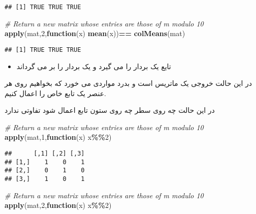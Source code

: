 \documentclass[
]{article}
\newenvironment{Shaded}{\begin{snugshade}}{\end{snugshade}}
\newcommand{\CommentTok}[1]{\textcolor[rgb]{0.56,0.35,0.01}{\textit{#1}}}
\newcommand{\ControlFlowTok}[1]{\textcolor[rgb]{0.13,0.29,0.53}{\textbf{#1}}}
\newcommand{\DecValTok}[1]{\textcolor[rgb]{0.00,0.00,0.81}{#1}}
\newcommand{\FunctionTok}[1]{\textcolor[rgb]{0.13,0.29,0.53}{\textbf{#1}}}
\newcommand{\NormalTok}[1]{#1}
\newcommand{\SpecialCharTok}[1]{\textcolor[rgb]{0.81,0.36,0.00}{\textbf{#1}}}
\providecommand{\tightlist}{%
  \setlength{\itemsep}{0pt}\setlength{\parskip}{0pt}}
\begin{document}
\begin{verbatim}
## [1] TRUE TRUE TRUE
\end{verbatim}

\begin{Shaded}
\begin{Highlighting}[]
\CommentTok{\# Return a new matrix whose entries are those of \textquotesingle{}m\textquotesingle{} modulo 10}
\FunctionTok{apply}\NormalTok{(mat,}\DecValTok{2}\NormalTok{,}\ControlFlowTok{function}\NormalTok{(x) }\FunctionTok{mean}\NormalTok{(x))}\SpecialCharTok{==} \FunctionTok{colMeans}\NormalTok{(mat)}
\end{Highlighting}
\end{Shaded}

\begin{verbatim}
## [1] TRUE TRUE TRUE
\end{verbatim}

\begin{itemize}
\tightlist
\item
  تایع یک بردار را می گیرد و یک بردار را بر می گرداند
\end{itemize}

در این حالت خروجی یک ماتریس است و بدرد مواردی می خورد که بخواهیم روی هر
عنصر یک تابع خاص را اعمال کنیم.

در این حالت چه روی سطر چه روی ستون تابع اعمال شود تفاوتی ندارد

\begin{Shaded}
\begin{Highlighting}[]
\CommentTok{\# Return a new matrix whose entries are those of \textquotesingle{}m\textquotesingle{} modulo 10}
\FunctionTok{apply}\NormalTok{(mat,}\DecValTok{1}\NormalTok{,}\ControlFlowTok{function}\NormalTok{(x) x}\SpecialCharTok{\%\%}\DecValTok{2}\NormalTok{)}
\end{Highlighting}
\end{Shaded}

\begin{verbatim}
##      [,1] [,2] [,3]
## [1,]    1    0    1
## [2,]    0    1    0
## [3,]    1    0    1
\end{verbatim}

\begin{Shaded}
\begin{Highlighting}[]
\CommentTok{\# Return a new matrix whose entries are those of \textquotesingle{}m\textquotesingle{} modulo 10}
\FunctionTok{apply}\NormalTok{(mat,}\DecValTok{2}\NormalTok{,}\ControlFlowTok{function}\NormalTok{(x) x}\SpecialCharTok{\%\%}\DecValTok{2}\NormalTok{)}
\end{Highlighting}
\end{Shaded}
\end{document}
